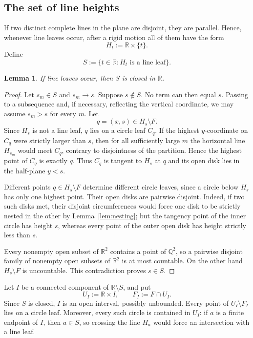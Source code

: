 \documentclass[11pt]{article}
\newtheorem{lemma}[theorem]{Lemma}
\newcommand{\R}{\mathbb{R}}
\begin{document}
\subsection{The set of line heights}

If two distinct complete lines in the plane are disjoint, they are parallel. Hence, whenever line leaves occur, after a rigid motion all of them have the form
\[
H_t:=\R\times\{t\}.
\]
Define
\[
S:=\{t\in\R:H_t\text{ is a line leaf}\}.
\]

\begin{lemma}\label{lem:Sclosed}
If line leaves occur, then $S$ is closed in $\R$.
\end{lemma}

\begin{proof}
Let $s_m\in S$ and $s_m\to s$. Suppose $s\notin S$. No term can then equal $s$. Passing to a subsequence and, if necessary, reflecting the vertical coordinate, we may assume $s_m>s$ for every $m$. Let
\[
q=(x,s)\in H_s\setminus F.
\]
Since $H_s$ is not a line leaf, $q$ lies on a circle leaf $C_q$. If the highest $y$-coordinate on $C_q$ were strictly larger than $s$, then for all sufficiently large $m$ the horizontal line $H_{s_m}$ would meet $C_q$, contrary to disjointness of the partition. Hence the highest point of $C_q$ is exactly $q$. Thus $C_q$ is tangent to $H_s$ at $q$ and its open disk lies in the half-plane $y<s$.

Different points $q\in H_s\setminus F$ determine different circle leaves, since a circle below $H_s$ has only one highest point. Their open disks are pairwise disjoint. Indeed, if two such disks met, their disjoint circumferences would force one disk to be strictly nested in the other by Lemma~\ref{lem:nesting}; but the tangency point of the inner circle has height $s$, whereas every point of the outer open disk has height strictly less than $s$.

Every nonempty open subset of $\R^2$ contains a point of $\mathbb Q^2$, so a pairwise disjoint family of nonempty open subsets of $\R^2$ is at most countable. On the other hand $H_s\setminus F$ is uncountable. This contradiction proves $s\in S$.
\end{proof}

Let $I$ be a connected component of $\R\setminus S$, and put
\[
U_I:=\R\times I,
\qquad
F_I:=F\cap U_I.
\]
Since $S$ is closed, $I$ is an open interval, possibly unbounded. Every point of $U_I\setminus F_I$ lies on a circle leaf. Moreover, every such circle is contained in $U_I$: if $a$ is a finite endpoint of $I$, then $a\in S$, so crossing the line $H_a$ would force an intersection with a line leaf.
\end{document}
